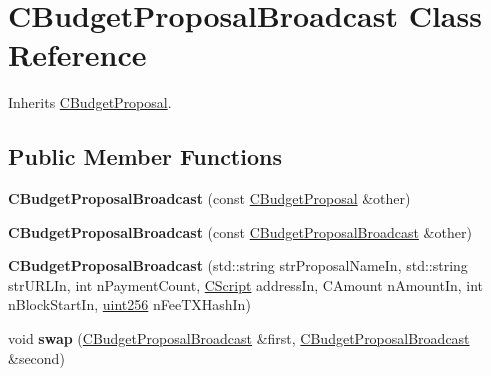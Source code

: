 \hypertarget{class_c_budget_proposal_broadcast}{}\section{C\+Budget\+Proposal\+Broadcast Class Reference}
\label{class_c_budget_proposal_broadcast}


Inherits \mbox{\hyperlink{class_c_budget_proposal}{C\+Budget\+Proposal}}.

\subsection*{Public Member Functions}
\begin{DoxyCompactItemize}
\item 
\mbox{\label{class_c_budget_proposal_broadcast_a1990e16be65f91b9fe8ddecbf368f108}} 
{\bfseries C\+Budget\+Proposal\+Broadcast} (const \mbox{\hyperlink{class_c_budget_proposal}{C\+Budget\+Proposal}} \&other)
\item 
\mbox{\label{class_c_budget_proposal_broadcast_abdebe74d19e013273ead62e83a62d962}} 
{\bfseries C\+Budget\+Proposal\+Broadcast} (const \mbox{\hyperlink{class_c_budget_proposal_broadcast}{C\+Budget\+Proposal\+Broadcast}} \&other)
\item 
\mbox{\label{class_c_budget_proposal_broadcast_ab730123d69f4481b88af666914c2da98}} 
{\bfseries C\+Budget\+Proposal\+Broadcast} (std\+::string str\+Proposal\+Name\+In, std\+::string str\+U\+R\+L\+In, int n\+Payment\+Count, \mbox{\hyperlink{class_c_script}{C\+Script}} address\+In, C\+Amount n\+Amount\+In, int n\+Block\+Start\+In, \mbox{\hyperlink{classuint256}{uint256}} n\+Fee\+T\+X\+Hash\+In)
\item 
\mbox{\label{class_c_budget_proposal_broadcast_af4fd5d1ded64319b83b78e6957e8c8f0}} 
void {\bfseries swap} (\mbox{\hyperlink{class_c_budget_proposal_broadcast}{C\+Budget\+Proposal\+Broadcast}} \&first, \mbox{\hyperlink{class_c_budget_proposal_broadcast}{C\+Budget\+Proposal\+Broadcast}} \&second)
\item 
\mbox{\label{class_c_budget_proposal_broadcast_a068fb44d8f0dce19c2fddad8e0b04e01}} 

\end{DoxyCompactItemize}
